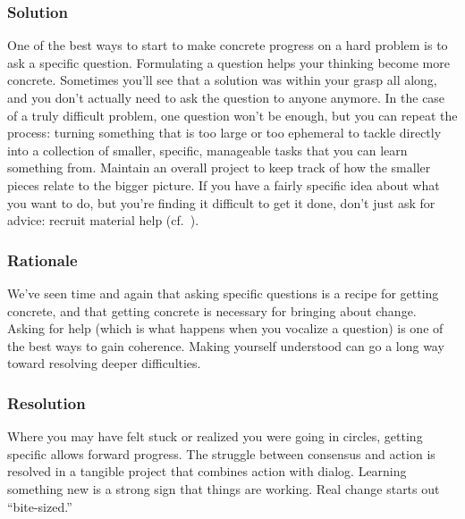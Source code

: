 \subsubsection*{Solution} 
One of the best ways to start to make concrete progress on a hard problem is to ask a specific question.   Formulating a question helps your thinking become more concrete.  Sometimes you'll see that a solution was within your grasp all along, and you don't actually need to ask the question to anyone anymore.  In the case of a truly difficult problem, one question won't be enough, but you can repeat the process: turning something that is too large or too ephemeral to tackle directly into a collection of smaller, specific, manageable tasks that you can learn something from. Maintain an overall project  to keep track of how the smaller pieces relate to the bigger picture.  If you have a fairly specific idea about what you want to do, but you're finding it difficult to get it done, don't just ask for advice: recruit material help (cf.~).

\subsubsection*{Rationale} 
We've seen time and again that asking specific questions is a recipe
for getting concrete, and that getting concrete is necessary for
bringing about change.  Asking for help (which is what happens
when you vocalize a question) is one of the best ways to
gain coherence.  Making yourself understood can go a long way
toward resolving deeper difficulties.

\subsubsection*{Resolution}
Where you may have felt stuck or realized you were going in circles, getting specific allows forward progress.  The struggle between consensus and action is resolved in a tangible project that combines action with dialog.  Learning something new is a strong sign that things are working.
%
Real change starts out ``bite-sized.'' 

